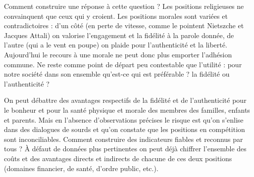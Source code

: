 Comment construire une réponse à cette question ? Les positions religieuses ne convainquent que ceux qui y croient. Les positions morales sont variées et contradictoires : d'un côté (en perte de vitesse, comme le pointent Nietszche et Jacques Attali) on valorise l'engagement et la fidélité à la parole donnée, de l'autre (qui a le vent en poupe) on plaide pour l'authenticité et la liberté. Aujourd'hui le recours à une morale ne peut donc plus emporter l'adhésion commune. Ne reste comme point de départ peu contestable que l'utilité : pour notre société dans son ensemble qu'est-ce qui est préférable ? la fidélité ou l'authenticité ?  

On peut débattre des avantages respectifs de la fidélité et de l'authenticité pour le bonheur et pour la santé physique et morale des membres des familles, enfants et parents. Mais en l'absence d'observations précises le risque est qu'on s'enlise dans des dialogues de sourds et qu'on constate que les positions en compétition sont inconciliables. Comment construire des indicateurs fiables et reconnus par tous ? À défaut de données plus pertinentes on peut déjà chiffrer l'ensemble des coûts et des avantages directs et indirects de chacune de ces deux positions (domaines financier, de santé, d'ordre public, etc.). 

